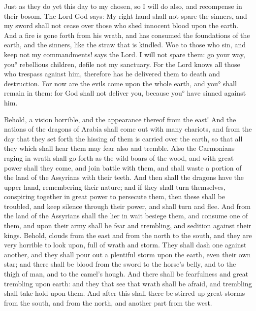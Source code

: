 {Just as they do yet this day to my chosen, so I will do also, and recompense in their bosom. The Lord God says:
My right hand shall not spare the sinners, and my sword shall not cease over those who shed innocent blood upon the earth.
And a fire is gone forth from his wrath, and has consumed the foundations of the earth, and the sinners, like the straw that is kindled.
Woe to those who sin, and keep not my commandments! says the Lord.
I will not spare them: go your way, you° rebellious children, defile not my sanctuary.
For the Lord knows all those who trespass against him, therefore has he delivered them to death and destruction.
For now are the evils come upon the whole earth, and you° shall remain in them: for God shall not deliver you, because you° have sinned against him.
\par }{\PP {}Behold, a vision horrible, and the appearance thereof from the east!
And the nations of the dragons of Arabia shall come out with many chariots, and from the day that they set forth the hissing of them is carried over the earth, so that all they which shall hear them may fear also and tremble.
Also the Carmonians raging in wrath shall go forth as the wild boars of the wood, and with great power shall they come, and join battle with them, and shall waste a portion of the land of the Assyrians with their teeth.
And then shall the dragons have the upper hand, remembering their
 nature; and if they shall turn themselves, conspiring together in great power to persecute them,
then these shall be troubled, and keep silence through their power, and shall turn and flee.
And from the land of the Assyrians shall the lier in wait besiege them, and consume one of them, and upon their army shall be fear and trembling, and sedition against their kings.
Behold, clouds from the east and from the north to the south, and they are very horrible to look upon, full of wrath and storm.
They shall dash one against another, and they shall pour out a plentiful
 storm upon the earth, even their own star; and there shall be blood from the sword to the horse’s belly,
and to the thigh of man, and to the camel’s hough.
And there shall be fearfulness and great trembling upon earth: and they that see that wrath shall be afraid, and trembling shall take hold upon them.
And after this shall there be stirred up great storms from the south, and from the north, and another part from the west.
}
